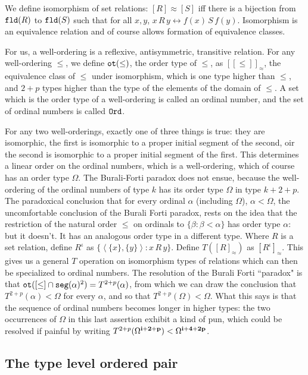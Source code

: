 \documentclass[12pt]{article}
\begin{document}
We define isomorphism of set relations:  $[R] \approx [S]$ iff there is a bijection from ${\tt fld}(R)$ to ${\tt fld}(S)$ such that for all $x,y$, $x \, R\, y \leftrightarrow f(x) \, S \, f(y)$.  Isomorphism is an equivalence relation
and of course allows formation of equivalence classes.

For us, a well-ordering is a reflexive, antisymmetric, transitive relation.  For any well-ordering $\leq$, we define ${\tt ot}(\leq)$, the order type of $\leq$, as $[[\leq]]_{\approx}$, the equivalence class of $\leq$ under isomorphism, which is
one type higher than $\leq$, and $2+p$ types higher than the type of the elements of the domain of $\leq$.  A set which is the order type of a well-ordering is called an ordinal number, and the set of ordinal numbers is called ${\tt Ord}$.

For any two well-orderings, exactly one of three things is true:  they are isomorphic, the first is isomorphic to a proper initial segment of the second, oir the second is isomorphic to a proper initial segment of the first.  This determines
a linear order on the ordinal numbers, which is a well-ordering, which of course has an order type $\Omega$.  The Burali-Forti paradox does not ensue, because the well-ordering of the ordinal numbers of type $k$ has its order type
$\Omega$ in type $k+2+p$.  The paradoxical conclusion that for every ordinal $\alpha$ (including $\Omega$), $\alpha<\Omega$, the uncomfortable conclusion of the Burali Forti paradox, rests on the idea that the restriction of the natural order $\leq$ on ordinals to $\{\beta:\beta <\alpha\}$ has order type $\alpha$: but it doesn't.  It has an analogous order type in a different type.  Where $R$ is a set relation, define $R^{\iota}$ as $\{\left<\{x\},\{y\}\right>:x\,R\, y\}$.
Define $T([R]_{\approx})$ as $[R^{\iota}]_{\approx}$.  This gives us a general $T$ operation on isomorphism types of relations which can then be specialized to ordinal numbers.  The resolution of the Burali Forti ``paradox"
is that ${\tt ot}([\leq] \cap {\tt seg}(\alpha)^2) = T^{2+p}(\alpha)$, from which we can draw the conclusion that $T^{2+p}(\alpha) < \Omega$ for every $\alpha$, and so that $T^{2+p}(\Omega) < \Omega$.  What this says is that the sequence of ordinal numbers becomes longer in higher types:  the two occurrences of $\Omega$ in this last assertion exhibit a kind of pun, which could be resolved if painful by writing $T^{2+p}(\Omega^{\bf i+2+p}) < \Omega^{\bf i+4+2p}$.

\subsection{The type level ordered pair}
\end{document}
